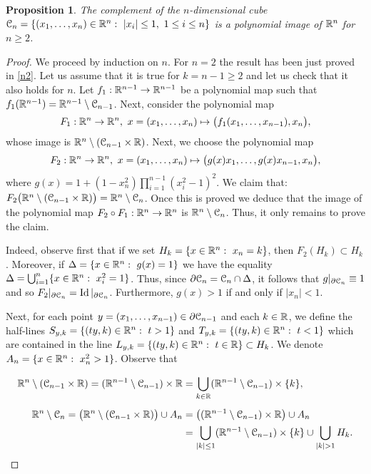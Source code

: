 \documentclass[11pt,a4paper]{amsart}
\newtheorem{prop}[theor]{Proposition}
\theoremstyle{definition}
\theoremstyle{remark}
\newcommand{\cube}{{\EuScript C}}
\newcommand{\Id}{\operatorname{Id}}
\begin{document}
\begin{prop}\label{box} 
The complement of the $n$-dimensional cube $\cube_n=\{(x_1,\dots, x_n)\in\R^n:\ |x_i|\le1,\ 1\le i\le n\}$ is a polynomial image of ${\mathbb R}^n$ for $n\geq2$.
\end{prop}
\begin{proof}
We proceed by induction on $n$. For $n=2$ the result has been just proved in \ref{n2}. Let us assume that it is true for $k=n-1\geq2$ and let us check that it also holds for $n$. Let $f_1:{\mathbb R}^{n-1}\rightarrow{\mathbb R}^{n-1}$ be a polynomial map such that $f_1(\R^{n-1})=\R^{n-1}\setminus\cube_{n-1}$. Next, consider the polynomial map 
$$
F_1:\R^n\rightarrow\R^n,\ x=(x_1,\dots,x_n)\mapsto\big(f_1(x_1,\dots,x_{n-1}), x_n\big),
$$
whose image is $\R^n\setminus(\cube_{n-1}\times\R)$. Next, we choose the polynomial map 
$$
F_2:\R^n\rightarrow\R^n,\ x=(x_1,\dots,x_n)\mapsto\big(g(x)x_1,\dots,g(x)x_{n-1},x_n\big),
$$
where $g(x)=1+(1-x_n^2)\prod_{i=1}^{n-1}(x_i^2-1)^2$. We claim that: $F_2\big(\R^n\setminus(\cube_{n-1}\times\R)\big)=\R^n\setminus\cube_n$. Once this is proved we deduce that the image of the polynomial map $F_2\circ F_1:{\mathbb R}^n\to{\mathbb R}^n$ is $\R^n\setminus\cube_n$.
Thus, it only remains to prove the claim.

Indeed, observe first that if we set $H_k=\{x\in{\mathbb R}^n:\ x_n=k\}$, then $F_2(H_k)\subset H_k$. Moreover, if $\Delta=\{x\in\R^n:\ g(x)=1\}$ we have the equality $\Delta=\bigcup_{i=1}^n\{x\in\R^n:\ x_i^2=1\}$. Thus, since $\partial\cube_n=\cube_n\cap\Delta$, it follows that $g|_{\partial\cube_n}\equiv1$ and so $F_2|_{\partial\cube_n}=\Id|_{\partial\cube_n}$. Furthermore, $g(x)>1$ if and only if $|x_n|<1$. 

Next, for each point $y=(x_1,\ldots,x_{n-1})\in\partial \cube_{n-1}$ and each $k\in{\mathbb R}$, we define the half-lines $S_{y,k}=\{(ty,k)\in{\mathbb R}^n:\ t>1\}$ and $T_{y,k}=\{(ty,k)\in{\mathbb R}^n:\ t<1\}$ which are contained in the line $L_{y,k}=\{(ty,k)\in{\mathbb R}^n:\ t\in{\mathbb R}\}\subset H_k$. We denote $A_n=\{x\in\R^n:\ x_n^2>1\}$. Observe that 

\begin{align*}
\R^n\setminus(\cube_{n-1}\times\R)=(\R^{n-1}\setminus\cube_{n-1})\times\R&=\bigcup_{k\in\R}(\R^{n-1}\setminus\cube_{n-1})\times\{k\},\\[5pt]
\R^n\setminus\cube_n=\big(\R^n\setminus(\cube_{n-1}\times\R)\big)\cup A_n&=\big((\R^{n-1}\setminus\cube_{n-1})\times\R\big)\cup A_n\\
&=\bigcup_{|k|\leq1}(\R^{n-1}\setminus\cube_{n-1})\times\{k\}\cup\bigcup_{|k|>1}H_k.
\end{align*}


\end{proof}
\end{document}
